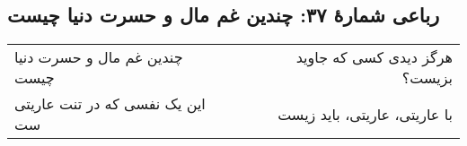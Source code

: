\begin{center}
\section*{رباعی شمارهٔ ۳۷: چندین غم مال و حسرت دنیا چیست}
\label{sec:037}
\begin{longtable}{l p{0.5cm} r}
چندین غم مال و حسرت دنیا چیست
&&
هرگز دیدی کسی که جاوید بزیست؟
\\
این یک نفسی که در تنت عاریتی ست
&&
با عاریتی، عاریتی، باید زیست
\\
\end{longtable}
\end{center}
